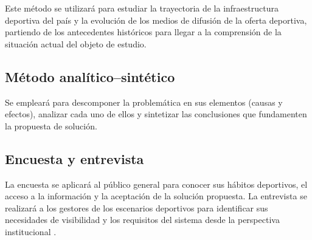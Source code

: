 Este m\'etodo se utilizar\'a para estudiar la trayectoria de la infraestructura
deportiva del pa\'is y la evoluci\'on de los medios de difusi\'on de la oferta
deportiva, partiendo de los antecedentes hist\'oricos para llegar a la
comprensi\'on de la situaci\'on actual del objeto de estudio.

\subsection{M\'etodo anal\'itico--sint\'etico}

Se emplear\'a para descomponer la problem\'atica en sus elementos (causas y
efectos), analizar cada uno de ellos y sintetizar las conclusiones que
fundamenten la propuesta de soluci\'on.

\subsection{Encuesta y entrevista}

La encuesta se aplicar\'a al p\'ublico general para conocer sus h\'abitos
deportivos, el acceso a la informaci\'on y la aceptaci\'on de la soluci\'on
propuesta. La entrevista se realizar\'a a los gestores de los escenarios
deportivos para identificar sus necesidades de visibilidad y los requisitos
del sistema desde la perspectiva institucional \citep{hernandez2014}.
